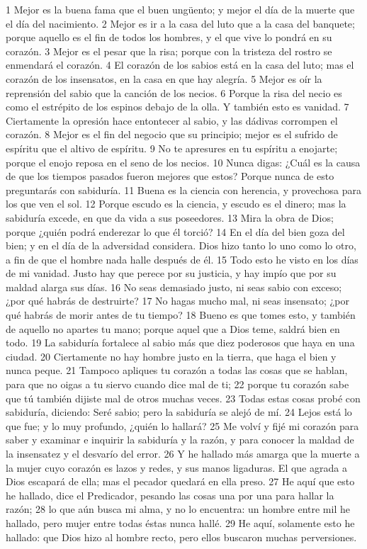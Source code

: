 1 Mejor es la buena fama que el buen ungüento; y mejor el día de la muerte que el día del nacimiento.
2 Mejor es ir a la casa del luto que a la casa del banquete; porque aquello es el fin de todos los hombres, y el que vive lo pondrá en su corazón.
3 Mejor es el pesar que la risa; porque con la tristeza del rostro se enmendará el corazón.
4 El corazón de los sabios está en la casa del luto; mas el corazón de los insensatos, en la casa en que hay alegría.
5 Mejor es oír la reprensión del sabio que la canción de los necios.
6 Porque la risa del necio es como el estrépito de los espinos debajo de la olla. Y también esto es vanidad.
7 Ciertamente la opresión hace entontecer al sabio, y las dádivas corrompen el corazón.
8 Mejor es el fin del negocio que su principio; mejor es el sufrido de espíritu que el altivo de espíritu.
9 No te apresures en tu espíritu a enojarte; porque el enojo reposa en el seno de los necios.
10 Nunca digas: ¿Cuál es la causa de que los tiempos pasados fueron mejores que estos? Porque nunca de esto preguntarás con sabiduría.
11 Buena es la ciencia con herencia, y provechosa para los que ven el sol.
12 Porque escudo es la ciencia, y escudo es el dinero; mas la sabiduría excede, en que da vida a sus poseedores.
13 Mira la obra de Dios; porque ¿quién podrá enderezar lo que él torció?
14 En el día del bien goza del bien; y en el día de la adversidad considera. Dios hizo tanto lo uno como lo otro, a fin de que el hombre nada halle después de él.
15 Todo esto he visto en los días de mi vanidad. Justo hay que perece por su justicia, y hay impío que por su maldad alarga sus días.
16 No seas demasiado justo, ni seas sabio con exceso; ¿por qué habrás de destruirte?
17 No hagas mucho mal, ni seas insensato; ¿por qué habrás de morir antes de tu tiempo?
18 Bueno es que tomes esto, y también de aquello no apartes tu mano; porque aquel que a Dios teme, saldrá bien en todo.
19 La sabiduría fortalece al sabio más que diez poderosos que haya en una ciudad.
20 Ciertamente no hay hombre justo en la tierra, que haga el bien y nunca peque. 
21 Tampoco apliques tu corazón a todas las cosas que se hablan, para que no oigas a tu siervo cuando dice mal de ti;
22 porque tu corazón sabe que tú también dijiste mal de otros muchas veces.
23 Todas estas cosas probé con sabiduría, diciendo: Seré sabio; pero la sabiduría se alejó de mí.
24 Lejos está lo que fue; y lo muy profundo, ¿quién lo hallará?
25 Me volví y fijé mi corazón para saber y examinar e inquirir la sabiduría y la razón, y para conocer la maldad de la insensatez y el desvarío del error.
26 Y he hallado más amarga que la muerte a la mujer cuyo corazón es lazos y redes, y sus manos ligaduras. El que agrada a Dios escapará de ella; mas el pecador quedará en ella preso.
27 He aquí que esto he hallado, dice el Predicador, pesando las cosas una por una para hallar la razón;
28 lo que aún busca mi alma, y no lo encuentra: un hombre entre mil he hallado, pero mujer entre todas éstas nunca hallé.
29 He aquí, solamente esto he hallado: que Dios hizo al hombre recto, pero ellos buscaron muchas perversiones.

